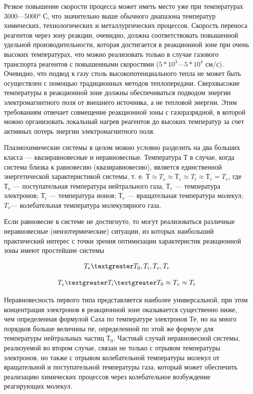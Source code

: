 \documentclass[10pt, a4paper]{article}
\begin{document}
Резкое повышение скорости процесса может иметь место уже при температурах 3000—5000° С, что значительно выше обычного диапазона температур химических, технологических и  металлургических процессов. Скорость переноса реагентов через зону реакции, очевидно, должна соответствовать повышенной удельной производительности, которая достигается в реакционной зоне при очень высоких температурах, что можно реализовать только в случае газового транспорта реагентов с повышенными скоростями ($5*10^{3}—5*10^{4}$ см/с). 
Очевидно, что подвод к газу столь высокопотенциального тепла не может быть осуществлен с помощью традиционных методов теплопередачи. Сверхвысокие температуры в реакционной зоне должны обеспечиваться подводом энергии электромагнитного поля от внешнего источника, а не тепловой энергии. Этим требованиям отвечает совмещение реакционной зоны с газоразрядной, в которой можно организовать локальный нагрев реагентов до высоких температур за счет активных потерь энергии электромагнитного поля.

Плазмохимические системы в целом можно условно разделить на два больших класса — квазиравновесные и неравновесные.
Температура Т в случае, когда система близка к равновесию (квазиравновесию), является единственной энергетической характеристикой системы, т. е. $Т \approx T_{o} \approx Т_{e} \approx T_{i} \approx  Т_{r} = T_{v}$, где $Т_{o}$ — поступательная температура нейтрального газа, $Т_e$ — температура электронов; $Т_i$ — температура ионов; $Т_r$ — вращательная температура молекул; $T_v$— колебательная температура молекулярного газа. 

Если равновесие в системе не достигнуто, то могут реализоваться различные неравновесные (неизотермические) ситуации, из которых наибольший практический интерес с точки зрения оптимизации характеристик реакционной зоны имеют простейшие системы 

\begin{equation}
T_e \textgreater T_0, T_i, T_v,T_r
\end{equation}

\begin{equation}
T_e \textgreater T_i \textgreater T_0  \approx T_v  \approx T_r
\end{equation}

Неравновесность первого типа представляется наиболее универсальной, при этом концентрация электронов в реакционной зоне оказывается существенно ниже, чем определенная формулой Саха по температуре электронов Те, но на много порядков больше величины пе, определенной по этой же формуле для температуры  нейтральных частиц $Т_0$. Частный случай неравновесной системы, реализуемой во втором случае, связан не только с отрывом температуры электронов, но также с отрывом колебательной температуры  молекул от вращательной и поступательной температуры газа, который может обеспечить реализацию химических процессов через колебательное возбуждение реагирующих молекул. 
\end{document}
